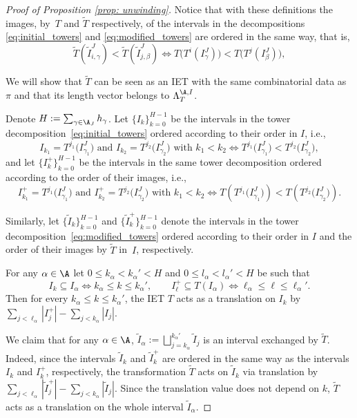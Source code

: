 \begin{proof}[Proof of Proposition \ref{prop: unwinding}]
Notice that with these definitions the images, by~$T$ and $\tilde T$ respectively, of the intervals in the decompositions \eqref{eq:initial_towers} and \eqref{eq:modified_towers} are ordered in the same way, that is,
\[
 \tilde T(\tilde I_{i, \gamma}^J) < \tilde T(\tilde I_{j, \beta}^J ) \iff T \big( T^i(I_\gamma^J)\big) < T \big( T^j(I_\beta^J) \big),
\]

We will show that $\tilde T$ can be seen as an IET with the same combinatorial data as~$\pi$ and that its length vector belongs to $\Lambda^{\A, I}_T$.

Denote $H:= \sum_{\gamma\in\mathcal \A_J}h_{\gamma}$. Let $\{I_k\}_{k = 0}^{H - 1}$ be the intervals in the tower decomposition~\eqref{eq:initial_towers} ordered according to their order in $I$, i.e.,
\[
I_{k_1}=T^{j_1}\big(I_{\gamma_1}^J\big)\text{ and }I_{k_2}=T^{j_2}\big(I_{\gamma_2}^J\big)\text{ with }k_1<k_2\iff T^{j_1}\big(I_{\gamma_1}^J\big)<T^{j_2}\big(I_{\gamma_2}^J\big),
\]
and let $\{I_k^+\}_{k = 0}^{H - 1}$ be the intervals in the same tower decomposition ordered according to the order of their images, i.e.,
\[
I_{k_1}^+=T^{j_1}\big(I_{\gamma_1}^J\big)\text{ and }I_{k_2}^+=T^{j_2}\big(I_{\gamma_2}^J\big)\text{ with }k_1<k_2\iff T\left(T^{j_1}\big(I_{\gamma_1}^J\big)\right)<T\left(T^{j_2}\big(I_{\gamma_2}^J\big)\right).
\]

Similarly, let $\{\tilde I_k\}_{k = 0}^{H - 1}$ and $\{\tilde I_k^+\}_{k = 0}^{H - 1}$ denote the intervals in the tower decomposition~\eqref{eq:modified_towers} ordered according to their order in $I$ and the order of their images by $\tilde T$ in~$I$, respectively.

For any $\alpha \in \A$ let $0\le k_\alpha< k_{\alpha}' < H$ and $0\le l_\alpha< l_{\alpha}' < H$ be such that
\[
I_{k}\subseteq I_{\alpha}\iff k_{\alpha}\le k\le k_{\alpha}', \qquad I_{\ell}^+\subseteq T(I_{\alpha})\iff \ell_{\alpha}\le \ell\le \ell_{\alpha}'.
\]
Then for every $k_{\alpha}\le k\le k_{\alpha}'$, the IET $T$ acts as a translation on $I_{k}$ by $\sum_{j<\ell_\alpha}|I_j^+|-\sum_{j<k_\alpha}|I_j|$.

We claim that for any $\alpha \in \A$, $\tilde I_{\alpha}:=\bigsqcup_{j=k_\alpha}^{k_\alpha'}\tilde I_j$ is an interval exchanged by $\tilde T$.
Indeed, since the intervals $\tilde I_k$ and $\tilde I_k^+$ are ordered in the same way as the intervals $I_k$ and $I_k^+$, respectively, the transformation $\tilde{T}$ acts on $\tilde I_k$ via translation by $\sum_{j<\ell_\alpha}|\tilde I_j^+|-\sum_{j<k_\alpha}|\tilde I_j|$. Since the translation value does not depend on $k$, $\tilde{T}$ acts as a translation on the whole interval $\tilde I_{\alpha}$.


\end{proof}
